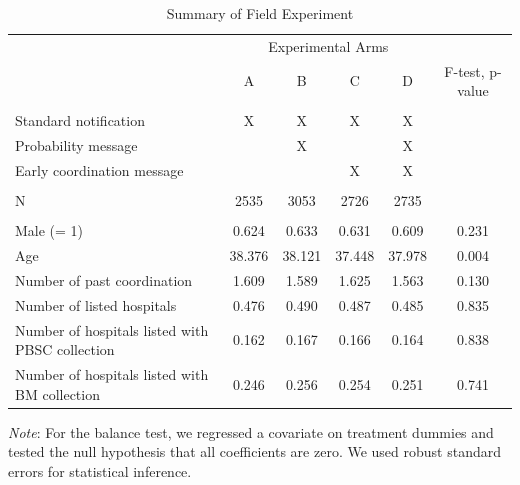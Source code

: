 \documentclass [12pt, a4paper]{article}
\begin{document}
\begin{table}

\caption{\label{tab:summary}Summary of Field Experiment}
\centering
\fontsize{9}{11}\selectfont
\begin{threeparttable}
\begin{tabular}[t]{lccccc}
\toprule
\multicolumn{1}{c}{ } & \multicolumn{4}{c}{Experimental Arms} & \multicolumn{1}{c}{ } \\
\cmidrule(l{3pt}r{3pt}){2-5}
 & A & B & C & D & F-test, p-value\\
\midrule
\addlinespace[0.3em]
\multicolumn{6}{l}{\textbf{A. Interventions}}\\
\hspace{1em}Standard notification & X & X & X & X & \\
\hspace{1em}Probability message &  & X &  & X & \\
\hspace{1em}Early coordination message &  &  & X & X & \\
\addlinespace[0.3em]
\multicolumn{6}{l}{\textbf{B. Sample Size}}\\
\hspace{1em}N & 2535 & 3053 & 2726 & 2735 & \\
\addlinespace[0.3em]
\multicolumn{6}{l}{\textbf{C. Balance Test}}\\
\hspace{1em}Male (= 1) & 0.624 & 0.633 & 0.631 & 0.609 & 0.231\\
\hspace{1em}Age & 38.376 & 38.121 & 37.448 & 37.978 & 0.004\\
\hspace{1em}Number of past coordination & 1.609 & 1.589 & 1.625 & 1.563 & 0.130\\
\hspace{1em}Number of listed hospitals & 0.476 & 0.490 & 0.487 & 0.485 & 0.835\\
\hspace{1em}Number of hospitals listed with PBSC collection & 0.162 & 0.167 & 0.166 & 0.164 & 0.838\\
\hspace{1em}Number of hospitals listed with BM collection & 0.246 & 0.256 & 0.254 & 0.251 & 0.741\\
\bottomrule
\end{tabular}
\begin{tablenotes}
\item \emph{Note}: For the balance test, we regressed a covariate on treatment dummies and tested the null hypothesis that all coefficients are zero. We used robust standard errors for statistical inference.
\end{tablenotes}
\end{threeparttable}
\end{table}
\end{document}
